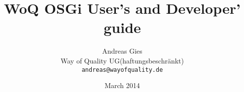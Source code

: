 \documentclass[11pt,a4paper,titlepage,twoside]{report}
\title{WoQ OSGi User's and Developer' guide}
\author{Andreas Gies\\
  Way of Quality UG(haftungsbeschr\"{a}nkt)\\
  \texttt{andreas@wayofquality.de}}
\date{March 2014}
\begin{document}
\maketitle
\renewcommand{\abstractname}{Executive Summary}
\begin{abstract}
\end{abstract}


\end{document}
